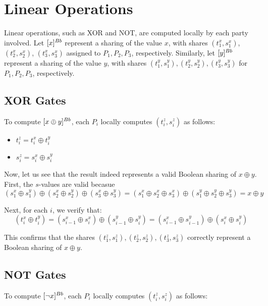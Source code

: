 \section{Linear Operations}

Linear operations, such as XOR and NOT, are computed locally by each party involved.
Let $[x]^{Bb}$ represent a sharing of the value $x$, with shares $(t^x_1, s^x_1)$, $(t^x_2, s^x_2)$, $(t^x_3, s^x_3)$ assigned to $P_1, P_2, P_3$, respectively. Similarly, let $[y]^{Bb}$ represent a sharing of the value $y$, with shares $(t^y_1, s^y_1), (t^y_2, s^y_2), (t^y_3, s^y_3)$ for $P_1, P_2, P_3$, respectively.

\subsection{XOR Gates}

To compute $[x \oplus y]^{Bb}$, each $P_i$ locally computes $(t^z_i, s^z_i)$ as follows:

\begin{itemize}
    \item $t^z_i = t^x_i \oplus t^y_i$
    \item $s^z_i = s^x_i \oplus s^y_i$
\end{itemize}

Now, let us see that the result indeed represents a valid Boolean sharing of $x \oplus y$. First, the $s$-values are valid becasue
\begin{equation}
    (s^x_1 \oplus s^y_1) \oplus (s^x_2 \oplus s^y_2) \oplus (s^x_3 \oplus s^y_3) = (s^x_1 \oplus s^x_2 \oplus s^x_3) \oplus (s^y_1 \oplus s^y_2 \oplus s^y_3) = x \oplus y
\end{equation}

Next, for each $i$, we verify that:
\begin{equation}
    (t^x_i \oplus t^y_i) = (s^x_{i - 1} \oplus s^x_i) \oplus (s^y_{i - 1} \oplus s^y_i) = (s^x_{i - 1} \oplus s^y_{i - 1}) \oplus (s^x_i \oplus s^y_i)
\end{equation}

This confirms that the shares $(t^z_1, s^z_1), (t^z_2, s^z_2), (t^z_3, s^z_3)$ correctly represent a Boolean sharing of $x \oplus y$.

\subsection{NOT Gates}

To compute $[\neg x]^{Bb}$, each $P_i$ locally computes $(t^z_i, s^z_i)$ as follows:

